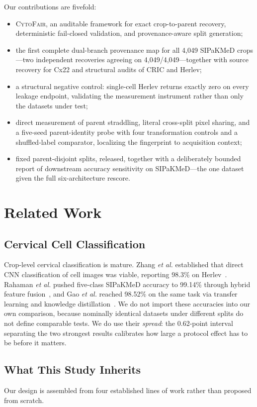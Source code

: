 \documentclass[conference]{IEEEtran}
\newcommand{\cytofair}{\textsc{CytoFair}}
\begin{document}
Our contributions are fivefold:
\begin{itemize}
    \item \cytofair, an auditable framework for exact crop-to-parent recovery, deterministic fail-closed validation, and provenance-aware split generation;
    \item the first complete dual-branch provenance map for all 4,049 SIPaKMeD crops---two independent recoveries agreeing on 4,049/4,049---together with source recovery for Cx22 and structural audits of CRIC and Herlev;
    \item a structural negative control: single-cell Herlev returns exactly zero on every leakage endpoint, validating the measurement instrument rather than only the datasets under test;
    \item direct measurement of parent straddling, literal cross-split pixel sharing, and a five-seed parent-identity probe with four transformation controls and a shuffled-label comparator, localizing the fingerprint to acquisition context;
    \item fixed parent-disjoint splits, released, together with a deliberately bounded report of downstream accuracy sensitivity on SIPaKMeD---the one dataset given the full six-architecture rescore.
\end{itemize}

\section{Related Work}
\subsection{Cervical Cell Classification}
Crop-level cervical classification is mature.
Zhang \emph{et al.} established that direct CNN classification of cell images was viable, reporting 98.3\% on Herlev~\cite{zhang2017deeppap}.
Rahaman \emph{et al.} pushed five-class SIPaKMeD accuracy to 99.14\% through hybrid feature fusion~\cite{rahaman2021deepcervix}, and Gao \emph{et al.} reached 98.52\% on the same task via transfer learning and knowledge distillation~\cite{gao2022knowledge}.
We do not import these accuracies into our own comparison, because nominally identical datasets under different splits do not define comparable tests.
We do use their \emph{spread}: the 0.62-point interval separating the two strongest results calibrates how large a protocol effect has to be before it matters.

\subsection{What This Study Inherits}
Our design is assembled from four established lines of work rather than proposed from scratch.
\end{document}
